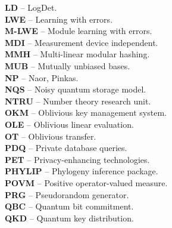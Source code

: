 \textbf{LD} -- LogDet.
\vspace{0.5cm}\\
\textbf{LWE} -- Learning with errors.
\vspace{0.5cm}\\
\textbf{M-LWE} -- Module learning with errors.
\vspace{0.5cm}\\
\textbf{MDI} -- Measurement device independent.
\vspace{0.5cm}\\
\textbf{MMH} -- Multi-linear modular hashing.
\vspace{0.5cm}\\
\textbf{MUB} -- Mutually unbiased bases.
\vspace{0.5cm}\\
\textbf{NP} -- Naor, Pinkas.
\vspace{0.5cm}\\
\textbf{NQS} -- Noisy quantum storage model.
\vspace{0.5cm}\\
\textbf{NTRU} -- Number theory research unit.
\vspace{0.5cm}\\
\textbf{OKM} -- Oblivious key management system.
\vspace{0.5cm}\\
\textbf{OLE} -- Oblivious linear evaluation.
\vspace{0.5cm}\\
\textbf{OT} -- Oblivious transfer.
\vspace{0.5cm}\\
\textbf{PDQ} -- Private database queries.
\vspace{0.5cm}\\
\textbf{PET} -- Privacy-enhancing technologies.
\vspace{0.5cm}\\
\textbf{PHYLIP} -- Phylogeny inference package.
\vspace{0.5cm}\\
\textbf{POVM} -- Positive operator-valued measure.
\vspace{0.5cm}\\
\textbf{PRG} -- Pseudorandom generator.
\vspace{0.5cm}\\
\textbf{QBC} -- Quantum bit commitment.
\vspace{0.5cm}\\
\textbf{QKD} -- Quantum key distribution.
\vspace{0.5cm}\\
